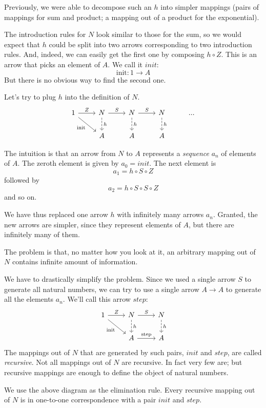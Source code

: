 \documentclass[DaoFP]{subfiles}
\begin{document}
Previously, we were able to decompose such an $h$ into simpler mappings (pairs of mappings for sum and product; a mapping out of a product for the exponential). 

The introduction rules for $N$ look similar to those for the sum, so we would expect that $h$ could be split into two arrows corresponding to two introduction rules. And, indeed, we can easily get the first one by composing $h \circ Z$. This is an arrow that picks an element of $A$. We call it $init$:
\[\text{init} \colon 1 \to A \]
But there is no obvious way to find the second one. 


Let's try to plug $h$ into the definition of $N$.
\[
 \begin{tikzcd}
 1
 \arrow[r, "Z"]
 \arrow[rd, "\text{init}"']
 &N
  \arrow[r, "S"]
\arrow[d, dashed, "h"]
&N
  \arrow[r, "S"]
\arrow[d, dashed, "h"]
&N
\arrow[d, dashed, "h"]
& ...
\\
& A
& A
& A
  \end{tikzcd}
\]

The intuition is that an arrow from $N$ to $A$ represents a \emph{sequence} $a_n$ of elements of $A$. The zeroth element is given by $a_0=init$. The next element is
\[a_1 = h \circ S \circ Z \]
followed by
\[a_2 = h \circ S \circ S \circ Z \]
and so on.

We have thus replaced one arrow $h$ with infinitely many arrows $a_n$. Granted, the new arrows are simpler, since they represent elements of $A$, but there are infinitely many of them. 

The problem is that, no matter how you look at it, an arbitrary mapping out of $N$ contains infinite amount of information.

We have to drastically simplify the problem. Since we used a single arrow $S$ to generate all natural numbers, we can try to use a single arrow $A \to A$ to generate all the elements $a_n$. We'll call this arrow $step$:
\[
 \begin{tikzcd}
 1
 \arrow[r, "Z"]
 \arrow[rd, "\text{init}"']
 &N
  \arrow[r, "S"]
\arrow[d, dashed, "h"]
&N
\arrow[d, dashed, "h"]
\\
& A
\arrow[r, "\text{step}"]
& A
  \end{tikzcd}
\]
The mappings out of $N$ that are generated by such pairs, $init$ and $step$, are called \emph{recursive}. Not all mappings out of $N$ are recursive. In fact very few are; but recursive mappings are enough to define the object of natural numbers. 

We use the above diagram as the elimination rule. Every recursive mapping out of $N$ is in one-to-one correspondence with a pair $init$ and $step$. 
\end{document}

